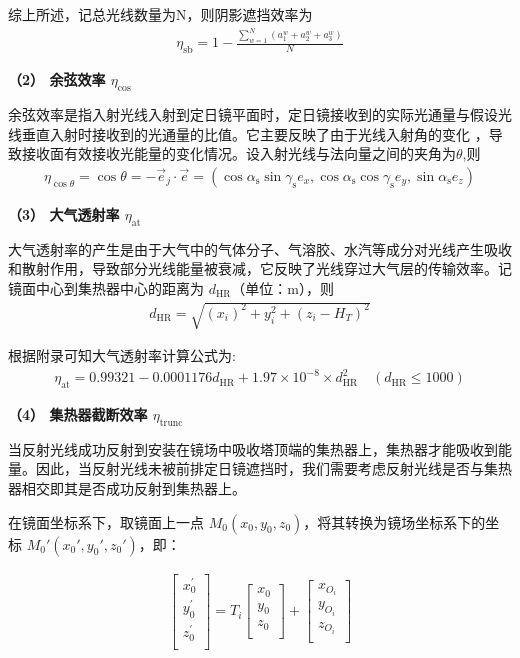 \documentclass[../main.tex]{subfiles}
\begin{document}
\par 综上所述，记总光线数量为N，则阴影遮挡效率为
\begin{align}\label{1.34}
 \eta _{\text{sb}}=1-\frac{\sum_{w=1}^N{\left( a_{1}^{w}+a_{2}^{w}+a_{3}^{w} \right)}}{N}
\end{align}
\par \textbf{（2） 余弦效率 $\eta_{\text{cos}}$}
\par 余弦效率是指入射光线入射到定日镜平面时，定日镜接收到的实际光通量与假设光线垂直入射时接收到的光通量的比值。它主要反映了由于光线入射角的变化 ，导致接收面有效接收光能量的变化情况。设入射光线与法向量之间的夹角为$\theta $,则
\begin{align}\label{1.35}
  \eta_{\cos\theta} = \cos\theta = -\vec{e}_j \cdot \vec{e}=(\cos \alpha _{\text{s}}\sin \gamma _{\text{s}}e_x, \cos \alpha _{\text{s}}\cos \gamma _{\text{s}}e_y, \sin \alpha _{\text{s}}e_z)
\end{align}
\par \textbf{（3） 大气透射率 $\eta_{\text{at}}$}
\par 大气透射率的产生是由于大气中的气体分子、气溶胶、水汽等成分对光线产生吸收和散射作用，导致部分光线能量被衰减，它反映了光线穿过大气层的传输效率。记镜面中心到集热器中心的距离为 $d_{\text{HR}}$（单位：$\text{m}$），则
\begin{align}\label{1.36}
 d_{\text{HR}} = \sqrt{(x_i)^2 + y_i^2 + (z_i - H_T)^2}
 \end{align}
\par 根据附录可知大气透射率计算公式为:
\begin{align}\label{1.36}
  \eta_{\text{at}} = 0.99321 - 0.0001176d_{\text{HR}} + 1.97 \times 10^{-8} \times d_{\text{HR}}^2 \quad (d_{\text{HR}} \leq 1000) 
\end{align}
\par \textbf{（4） 集热器截断效率 $\eta_{\text{trunc}}$}
\par 当反射光线成功反射到安装在镜场中吸收塔顶端的集热器上，集热器才能吸收到能量。因此，当反射光线未被前排定日镜遮挡时，我们需要考虑反射光线是否与集热器相交即其是否成功反射到集热器上。
\par 在镜面坐标系下，取镜面上一点 \( M_0(x_0, y_0, z_0) \)，将其转换为镜场坐标系下的坐标 \( M_0'(x_0', y_0', z_0') \)，即：

\begin{align}    \label{1.37}
\left[ \begin{array}{c}
x_{0}^{\prime}\\
y_{0}^{\prime}\\
z_{0}^{\prime}\\
\end{array} \right] =T_i\left[ \begin{array}{c}
x_0\\
y_0\\
z_0\\
\end{array} \right] +\left[ \begin{array}{c}
x_{O_{i}}\\
y_{O_{i}}\\
z_{O_{i}}\\
\end{array} \right] 
\end{align}
\end{document}
